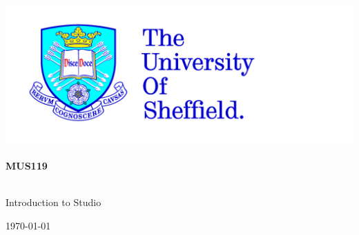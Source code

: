 
\begin{titlepage}

\begin{center}



\includegraphics[scale=0.2]{tuoslogo_cmyk_hi} \\




\HRule \\[0.4cm]
{ \huge \bfseries MUS119}\\[0.4cm]

\HRule \\[1.5cm]

\begin{minipage}{0.6\textwidth}
\begin{flushleft} \large
Introduction to Studio\\
\end{flushleft}
\end{minipage}

\vfill

{\large \today}

\end{center}

\end{titlepage}
